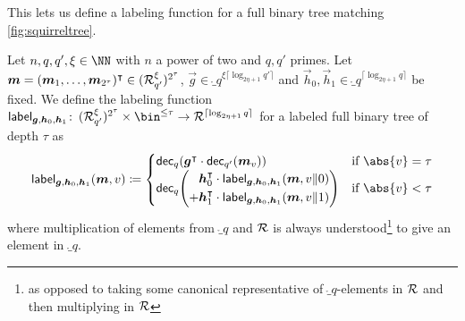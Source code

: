 This lets us define a labeling function for a full binary tree matching \autoref{fig:squirreltree}.


\begin{definition}\label{def:label}
  Let $n,q,q',\xi\in\NN$ with $n$ a power of two and $q,q'$ primes.
  Let $\boldsymbol{m}=(\boldsymbol{m}_{1},\dots,\boldsymbol{m}_{{2^{\tau}}})^\intercal\in(\mathcal{R}_{q'}^\xi)^{2^{\tau}}$, $\vec{g} \in \ring_{q}^{\xi\lceil\log_{2\eta+1} q'\rceil}$ and $\vec{h}_0,\vec{h}_1 \in \ring_q^{\lceil\log_{2\eta+1} q\rceil}$ be fixed.
  We define the labeling function
  $\lbl_{\vec{g},\vec{h}_0,\vec{h}_1}\colon\,
  (\ring^\xi_{q'})^{2^{\tau}}\times \bin^{\leq \tau} \to \ring^{\lceil \log_{2\eta+1} q \rceil}$
  for a labeled full binary tree of depth $\tau$ as
  \[
    \lbl_{\vec{g},\vec{h}_0,\vec{h}_1}(\vec{m},v) \coloneqq 
      \begin{cases}
          \decompmod{q}(\vec{g}^\transpose\cdot \decompmod{q'}(\vec{m}_{v})) & \text{if } \abs{v}=\tau\\ \decompmod{q}\mleft(
              \begin{aligned}
                 \vec{h}_0^\transpose \cdot\lbl_{\vec{g},\vec{h}_0,\vec{h}_1}(\vec{m},v\Vert 0)\\
               + \vec{h}_1^\transpose \cdot\lbl_{\vec{g},\vec{h}_0,\vec{h}_1}(\vec{m},v\Vert 1)
               \end{aligned}
              \mright)& \text{if } \abs{v}< \tau
      \end{cases}
  \]
  where multiplication of elements from $\ring_q$ and $\mathcal{R}$ is always understood\footnote{as opposed to taking some canonical representative of $\ring_q$-elements in $\mathcal{R}$ and then multiplying in $\mathcal{R}$} to give an element in $\ring_q$.
\end{definition}


